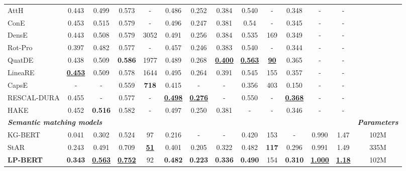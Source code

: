 \documentclass[journal]{IEEEtran}
\begin{document}
\begin{table*}[htbp]
{\begin{tabular}{l*{13}{c}}
			AttH\cite{chami2020low} & 0.443 & 0.499 & 0.573 & - & 0.486 & 0.252 & 0.384 & 0.540 & - & 0.348 & - & -  &\\ 
			ConE\cite{bai2021modeling} & 0.453 & 0.515 & 0.579 & - & 0.496 & 0.247 & 0.381 & 0.54	& - & 0.345 & - & -  &\\
			DensE\cite{lu2020dense} & 0.443 & 0.508 & 0.579 & 3052 & 0.491 & 0.256 & 0.384 & 0.535 & 169 & 0.349 & - & - &\\
			Rot-Pro\cite{song2021rot} & 0.397 & 0.482 & 0.577 & - & 0.457 & 0.246 & 0.383	& 0.540	& - & 0.344 & - & - &\\
			QuatDE\cite{gao2021quatde} & 0.438 & 0.509 & \textbf{0.586} & 1977 & 0.489 & 0.268 & \textbf{\underline{0.400}} & \textbf{\underline{0.563}} & \textbf{\underline{90}} & 0.365 & - & -  &\\
			LineaRE \cite{peng2020lineare} & \textbf{\underline{0.453}} & 0.509 & 0.578 & 1644 & 0.495 & 0.264	& 0.391	& 0.545	& 155 & 0.357 & - & - & \\
			CapsE\cite{vu2019capsule} & - & - & 0.559 & \textbf{718} & 0.415 & - & - & 0.356 & 403 & 0.150 & - & - &\\
			RESCAL-DURA \cite{zhang2020duality} & 0.455 & - & 0.577 & - & \textbf{\underline{0.498}} & \textbf{\underline{0.276}} & - & 0.550 & - & \textbf{\underline{0.368}} & - & - &\\
			HAKE\cite{zhang2020learning} & 0.452 & \textbf{0.516} & 0.582 & - & 0.497 & 0.250 & 0.381 & - & - & 0.346 & - & - & \\
			\midrule
			\multicolumn{11}{l}{\textbf{\emph{Semantic matching models}}} &&& \textbf{\emph{Parameters}} \\
			\midrule
			KG-BERT\cite{yao2019kg} & 0.041 & 0.302 & 0.524 & 97 & 0.216 & - & - & 0.420 & 153 & - & 0.990 & 1.47 & 102M\\
StAR\cite{wang2021structure} & 0.243 & 0.491 & 0.709 & \textbf{\underline{51}} & 0.401 & 0.205 & 0.322 & 0.482 & \textbf{117} & 0.296 & 0.991 & 1.49 & 335M \\
			\textbf{LP-BERT} & \textbf{0.343} & \textbf{\underline{0.563}} & \textbf{\underline{0.752}} & 92 & \textbf{0.482} & \textbf{0.223} & \textbf{0.336} & \textbf{0.490} & 154 & \textbf{0.310} & \textbf{\underline{1.000}} & \textbf{\underline{1.18}} & 102M \\
			\bottomrule
	\end{tabular}}
\end{table*}
\end{document}

